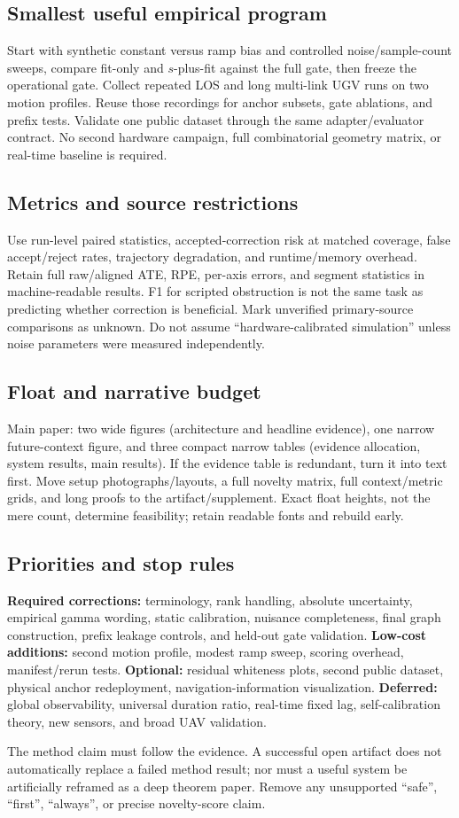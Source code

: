 \documentclass[conference]{IEEEtran}
\begin{document}
\subsection{Smallest useful empirical program}
Start with synthetic constant versus ramp bias and controlled noise/sample-count sweeps, compare fit-only and $s$-plus-fit against the full gate, then freeze the operational gate. Collect repeated LOS and long multi-link UGV runs on two motion profiles. Reuse those recordings for anchor subsets, gate ablations, and prefix tests. Validate one public dataset through the same adapter/evaluator contract. No second hardware campaign, full combinatorial geometry matrix, or real-time baseline is required.

\subsection{Metrics and source restrictions}
Use run-level paired statistics, accepted-correction risk at matched coverage, false accept/reject rates, trajectory degradation, and runtime/memory overhead. Retain full raw/aligned ATE, RPE, per-axis errors, and segment statistics in machine-readable results. F1 for scripted obstruction is not the same task as predicting whether correction is beneficial. Mark unverified primary-source comparisons as unknown. Do not assume ``hardware-calibrated simulation'' unless noise parameters were measured independently.

\subsection{Float and narrative budget}
Main paper: two wide figures (architecture and headline evidence), one narrow future-context figure, and three compact narrow tables (evidence allocation, system results, main results). If the evidence table is redundant, turn it into text first. Move setup photographs/layouts, a full novelty matrix, full context/metric grids, and long proofs to the artifact/supplement. Exact float heights, not the mere count, determine feasibility; retain readable fonts and rebuild early.

\subsection{Priorities and stop rules}
\textbf{Required corrections:} terminology, rank handling, absolute uncertainty, empirical gamma wording, static calibration, nuisance completeness, final graph construction, prefix leakage controls, and held-out gate validation.
\textbf{Low-cost additions:} second motion profile, modest ramp sweep, scoring overhead, manifest/rerun tests.
\textbf{Optional:} residual whiteness plots, second public dataset, physical anchor redeployment, navigation-information visualization.
\textbf{Deferred:} global observability, universal duration ratio, real-time fixed lag, self-calibration theory, new sensors, and broad UAV validation.

The method claim must follow the evidence. A successful open artifact does not automatically replace a failed method result; nor must a useful system be artificially reframed as a deep theorem paper. Remove any unsupported ``safe'', ``first'', ``always'', or precise novelty-score claim.
\fi
\end{document}
